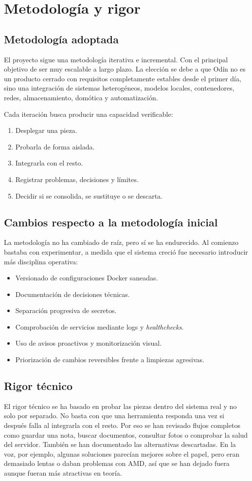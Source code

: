 \chapter{Metodología y rigor}

\section{Metodología adoptada}
El proyecto sigue una metodología iterativa e incremental. Con el principal objetivo de ser muy escalable a largo plazo. La elección se debe a que Odín no es un producto cerrado con requisitos completamente estables desde el primer día, sino una integración de sistemas heterogéneos, modelos locales, contenedores, redes, almacenamiento, domótica y automatización.

Cada iteración busca producir una capacidad verificable:
\begin{enumerate}
  \item Desplegar una pieza.
  \item Probarla de forma aislada.
  \item Integrarla con el resto.
  \item Registrar problemas, decisiones y límites.
  \item Decidir si se consolida, se sustituye o se descarta.
\end{enumerate}

\section{Cambios respecto a la metodología inicial}
La metodología no ha cambiado de raíz, pero sí se ha endurecido. Al comienzo bastaba con experimentar, a medida que el sistema creció fue necesario introducir más disciplina operativa:
\begin{itemize}
  \item Versionado de configuraciones Docker saneadas.
  \item Documentación de decisiones técnicas.
  \item Separación progresiva de secretos.
  \item Comprobación de servicios mediante logs y \textit{healthchecks}.
  \item Uso de avisos proactivos y monitorización visual.
  \item Priorización de cambios reversibles frente a limpiezas agresivas.
\end{itemize}

\section{Rigor técnico}
El rigor técnico se ha basado en probar las piezas dentro del sistema real y no solo por separado. No basta con que una herramienta responda una vez si después falla al integrarla con el resto. Por eso se han revisado flujos completos como guardar una nota, buscar documentos, consultar fotos o comprobar la salud del servidor. También se han documentado las alternativas descartadas. En la voz, por ejemplo, algunas soluciones parecían mejores sobre el papel, pero eran demasiado lentas o daban problemas con AMD, así que se han dejado fuera aunque fueran más atractivas en teoría.


